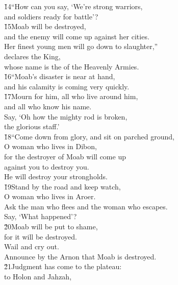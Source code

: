\begin{poetry}
\poeml \v{14}``How can you say, `We're strong warriors, \\
\poemll    and soldiers ready for battle'? \\
\poeml \v{15}Moab will be destroyed, \\
\poemll    and the enemy will come up against her cities. \\
\poeml Her finest young men will go down to slaughter,'' \\
\poemll    declares the King, \\
\poemlll       whose name is the  of the Heavenly Armies. \\
\poeml \v{16}``Moab's disaster is near at hand, \\
\poemll    and his calamity is coming very quickly. \\
\poeml \v{17}Mourn for him, all who live around him, \\
\poemll    and all who know his name. \\
\poeml Say, `Oh how the mighty rod is broken, \\
\poemll    the glorious staff.' \\
\poeml \v{18}``Come down from glory, and sit on parched ground, \\
\poemll    O woman who lives in Dibon, \\
\poeml for the destroyer of Moab will come up \\
\poemll    against you to destroy you. \\
\poemlll       He will destroy your strongholds. \\
\poeml \v{19}Stand by the road and keep watch, \\
\poemll    O woman who lives in Aroer. \\
\poeml Ask the man who flees and the woman who escapes. \\
\poemll    Say, `What happened'? \\
\poeml \v{20}Moab will be put to shame, \\
\poemll    for it will be destroyed. \\
\poeml Wail and cry out. \\
\poemll    Announce by the Arnon that Moab is destroyed. \\
\poeml \v{21}Judgment has come to the plateau: \\
\poemll    to Holon and Jahzah, \\

\end{poetry}

